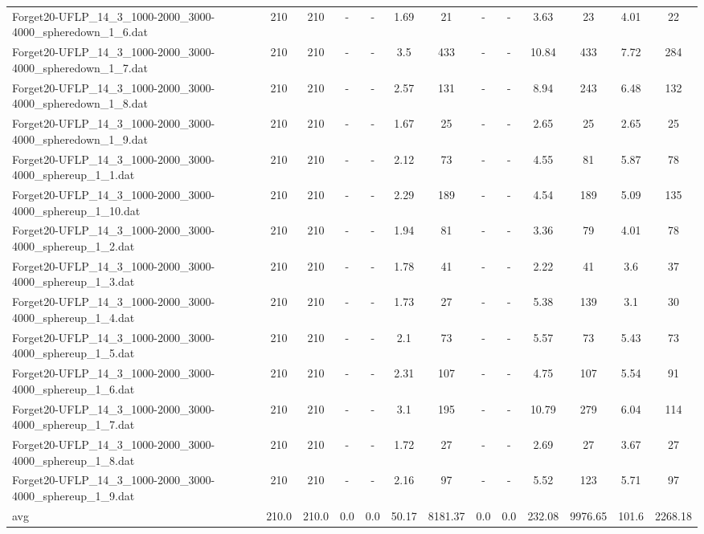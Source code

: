 \begin{table}[!ht]
{\begin{tabular}{lcccccccccccc}
Forget20-UFLP\_14\_3\_1000-2000\_3000-4000\_spheredown\_1\_6.dat & 210 & 210 &  - &  - & 1.69 & 21 &  - &  - & 3.63 & 23 & 4.01 & 22 \\
Forget20-UFLP\_14\_3\_1000-2000\_3000-4000\_spheredown\_1\_7.dat & 210 & 210 &  - &  - & 3.5 & 433 &  - &  - & 10.84 & 433 & 7.72 & 284 \\
Forget20-UFLP\_14\_3\_1000-2000\_3000-4000\_spheredown\_1\_8.dat & 210 & 210 &  - &  - & 2.57 & 131 &  - &  - & 8.94 & 243 & 6.48 & 132 \\
Forget20-UFLP\_14\_3\_1000-2000\_3000-4000\_spheredown\_1\_9.dat & 210 & 210 &  - &  - & 1.67 & 25 &  - &  - & 2.65 & 25 & 2.65 & 25 \\
Forget20-UFLP\_14\_3\_1000-2000\_3000-4000\_sphereup\_1\_1.dat & 210 & 210 &  - &  - & 2.12 & 73 &  - &  - & 4.55 & 81 & 5.87 & 78 \\
Forget20-UFLP\_14\_3\_1000-2000\_3000-4000\_sphereup\_1\_10.dat & 210 & 210 &  - &  - & 2.29 & 189 &  - &  - & 4.54 & 189 & 5.09 & 135 \\
Forget20-UFLP\_14\_3\_1000-2000\_3000-4000\_sphereup\_1\_2.dat & 210 & 210 &  - &  - & 1.94 & 81 &  - &  - & 3.36 & 79 & 4.01 & 78 \\
Forget20-UFLP\_14\_3\_1000-2000\_3000-4000\_sphereup\_1\_3.dat & 210 & 210 &  - &  - & 1.78 & 41 &  - &  - & 2.22 & 41 & 3.6 & 37 \\
Forget20-UFLP\_14\_3\_1000-2000\_3000-4000\_sphereup\_1\_4.dat & 210 & 210 &  - &  - & 1.73 & 27 &  - &  - & 5.38 & 139 & 3.1 & 30 \\
Forget20-UFLP\_14\_3\_1000-2000\_3000-4000\_sphereup\_1\_5.dat & 210 & 210 &  - &  - & 2.1 & 73 &  - &  - & 5.57 & 73 & 5.43 & 73 \\
Forget20-UFLP\_14\_3\_1000-2000\_3000-4000\_sphereup\_1\_6.dat & 210 & 210 &  - &  - & 2.31 & 107 &  - &  - & 4.75 & 107 & 5.54 & 91 \\
Forget20-UFLP\_14\_3\_1000-2000\_3000-4000\_sphereup\_1\_7.dat & 210 & 210 &  - &  - & 3.1 & 195 &  - &  - & 10.79 & 279 & 6.04 & 114 \\
Forget20-UFLP\_14\_3\_1000-2000\_3000-4000\_sphereup\_1\_8.dat & 210 & 210 &  - &  - & 1.72 & 27 &  - &  - & 2.69 & 27 & 3.67 & 27 \\
Forget20-UFLP\_14\_3\_1000-2000\_3000-4000\_sphereup\_1\_9.dat & 210 & 210 &  - &  - & 2.16 & 97 &  - &  - & 5.52 & 123 & 5.71 & 97 \\
\hline avg & 210.0 & 210.0 & 0.0& 0.0 & 50.17& 8181.37 & 0.0& 0.0 & 232.08& 9976.65 & 101.6& 2268.18\\ \hline

\end{tabular}}
\end{table}
